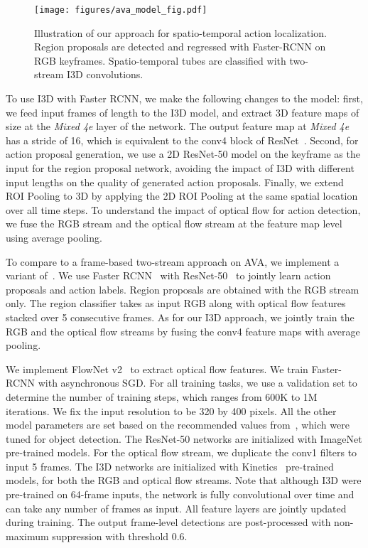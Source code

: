 \documentclass[10pt,twocolumn,letterpaper]{article}
\begin{document}
\begin{figure}[b]
\vspace{-2em}
\centering
\texttt{[image: figures/ava\_model\_fig.pdf]}
\caption{Illustration of our approach for spatio-temporal action localization. Region proposals are detected and regressed with Faster-RCNN on RGB keyframes. Spatio-temporal tubes are classified with two-stream I3D convolutions. 
}
\label{fig:model_figure}
\end{figure}

To use I3D with Faster RCNN, we make the following changes to the model: first, we feed input frames of length  to the I3D model, and extract 3D feature maps of size  at the \textit{Mixed 4e} layer of the network. The output feature map at \textit{Mixed 4e} has a stride of 16, which is equivalent to the conv4 block of ResNet~\cite{he2016resnet}. Second, for action proposal generation, we use a 2D ResNet-50 model on the keyframe as the input for the region proposal network, avoiding the impact of I3D with different input lengths on the quality of generated action proposals. Finally, we extend ROI Pooling to 3D by applying the 2D ROI Pooling at the same spatial location over all time steps. To understand the impact of optical flow for action detection, we fuse the RGB stream and the optical flow stream at the feature map level using average pooling.

To compare to a frame-based two-stream approach on AVA, we implement a variant of~\cite{peng2016multi}. We  use Faster RCNN~\cite{ren2015faster} with ResNet-50~\cite{he2016resnet} to jointly learn action proposals and action labels. Region proposals are obtained with the RGB stream only. 
The region classifier takes as input RGB along with optical flow features stacked over 5 consecutive frames. As for our I3D approach, we jointly train the RGB and the optical flow streams by fusing the conv4 feature maps with average pooling.  

 We implement FlowNet v2~\cite{flownet2} to extract optical flow features.  We train Faster-RCNN with asynchronous SGD. For all training tasks, we use a validation set to determine the number of training steps, which ranges from 600K to 1M iterations. We fix the input resolution to be 320 by 400 pixels. All the other model parameters are set based on the recommended values from~\cite{huang2016coco}, which were tuned for object detection. The ResNet-50 networks are initialized with ImageNet pre-trained models. For the optical flow stream, we duplicate the conv1 filters to input 5 frames. The I3D networks are initialized with Kinetics~\cite{kinetics17} pre-trained models, for both the RGB and optical flow streams. Note that although I3D were pre-trained on 64-frame inputs, the network is fully convolutional over time and can take any number of frames as input. All feature layers are jointly updated during training. The output frame-level detections are post-processed with non-maximum suppression with threshold 0.6.
\end{document}
